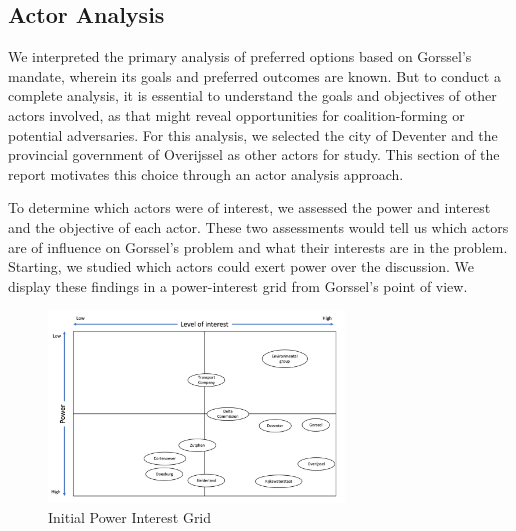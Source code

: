 \subsection{Actor Analysis}
We interpreted the primary analysis of preferred options based on Gorssel's mandate, wherein its goals and preferred outcomes are known. But to conduct a complete analysis, it is essential to understand the goals and objectives of other actors involved, as that might reveal opportunities for coalition-forming or potential adversaries. For this analysis, we selected the city of Deventer and the provincial government of Overijssel as other actors for study. This section of the report motivates this choice through an actor analysis approach. 

\bigskip

\noindent To determine which actors were of interest, we assessed the power and interest and the objective of each actor. These two assessments would tell us which actors are of influence on Gorssel's problem and what their interests are in the problem. Starting, we studied which actors could exert power over the discussion. We display these findings in a power-interest grid from Gorssel's point of view. \\

\begin{figure}[h]
    \centering
    \includegraphics[width=0.7\textwidth]{report/figures/PI grid.png}
    \caption{Initial Power Interest Grid}
    \label{fig:pi-grid}
\end{figure}



